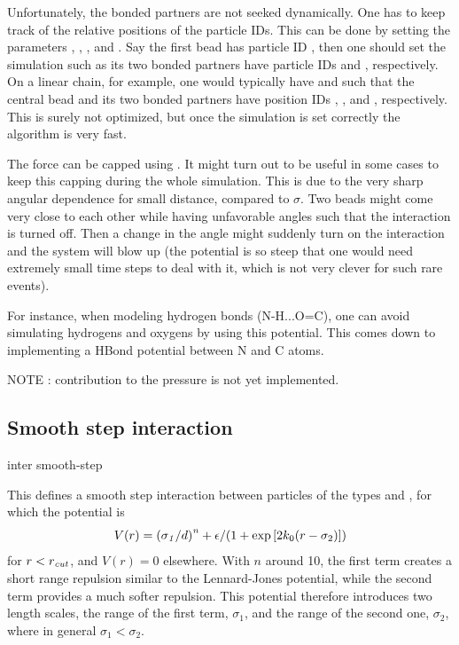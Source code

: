 Unfortunately, the bonded partners are not seeked dynamically. One has to keep track of the relative positions of the particle IDs. This can be done by setting the parameters , , , and . Say the first bead  has particle ID , then one should set the simulation such as its two bonded partners have particle IDs  and , respectively. On a linear chain, for example, one would typically have  and  such that the central bead and its two bonded partners have position IDs , , and , respectively. This is surely not optimized, but once the simulation is set correctly the algorithm is very fast. 

The force can be capped using . It might turn out to be useful in some cases to keep this capping during the whole simulation. This is due to the very sharp angular dependence for small distance, compared to $\sigma$. Two beads might come very close to each other while having unfavorable angles such that the interaction is turned off. Then a change in the angle might suddenly turn on the interaction and the system will blow up (the potential is so steep that one would need extremely small time steps to deal with it, which is not very clever for such rare events). 

For instance, when modeling hydrogen bonds (N-H...O=C), one can avoid simulating hydrogens and oxygens by using this potential. This comes down to implementing a HBond potential between N and C atoms. 

NOTE : contribution to the pressure is not yet implemented.

\subsection{Smooth step interaction}
\begin{essyntax}
  inter  
  smooth-step   \var{\epsilon} 
   
  \begin{features}
  \end{features}
\end{essyntax}
This defines a smooth step interaction between particles of the
types  and , for which the potential is
\begin{equation}
  V(r)= \left(\mathrm{\mathit{\sigma_1}}/d\right)^{\mathrm{\mathit{n}}} + \epsilon/(1 + \exp\left[2k_0 (r - \sigma_2)\right])
\end{equation}
for $r<r_\mathrm{\mathrm{\mathit{cut}}}$, and $V(r)=0$ elsewhere. With $n$ around 10, the
first term creates a short range repulsion similar to the Lennard-Jones
potential, while the second term provides a much softer repulsion. This
potential therefore introduces two length scales, the range of the first term,
$\sigma_1$, and the range of the second one, $\sigma_2$, where in general
$\sigma_1<\sigma_2$.

